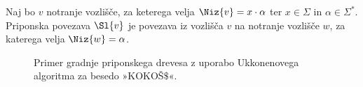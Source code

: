 \begin{defi}\label{def:sl}
    Naj bo $v$ notranje vozlišče, za keterega velja $\Niz{v}=x\cdot\alpha$ ter $x\in\Sigma$ in $\alpha\in\Sigma^*$. Priponska povezava $\Sl{v}$ je povezava iz vozlišča $v$ na notranje vozlišče $w$, za katerega velja $\Niz{w}=\alpha$.
\end{defi}

\begin{figure}[htb]
    \begin{subfigure}[t]{0.3\linewidth}
        \subcaption*{}
        
        \centering
        \label{fig:Ukkonen1}
    \end{subfigure}
    \hspace{0.5cm}
    \begin{subfigure}[t]{0.3\linewidth}
        \subcaption*{}
        
        \centering
        \label{fig:Ukkonen2}
    \end{subfigure}
    \hspace{0.5cm}
    \begin{subfigure}[t]{0.3\linewidth}
        \subcaption*{}
        
        \centering
        \label{fig:Ukkonen3}
    \end{subfigure}
    
    \begin{subfigure}[t]{0.3\linewidth}
        \subcaption*{}
        
        \centering
        \label{fig:Ukkonen4}
    \end{subfigure}
    \hspace{0.5cm}
    \begin{subfigure}[t]{0.3\linewidth}
        \subcaption*{}
        
        \centering
        \label{fig:Ukkonen5}
    \end{subfigure}
    \hspace{0.5cm}
    \begin{subfigure}[t]{0.3\textwidth}
        \subcaption*{}
        
        \centering
        \label{fig:Ukkonen6}
    \end{subfigure}

       \caption{Primer gradnje priponskega drevesa z uporabo Ukkonenovega algoritma za besedo »KOKOŠ$\$$«.} 
        \label{fig:Ukkonen}
\end{figure}

